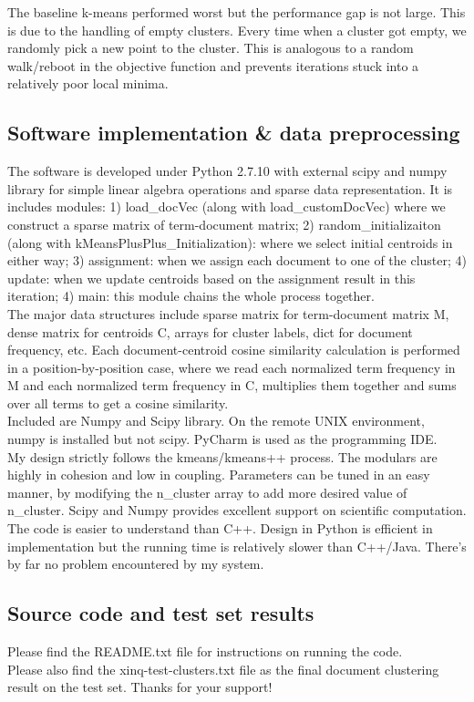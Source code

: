 \documentclass{article}
\begin{document}
The baseline k-means performed worst but the performance gap is not large. This is due to the handling of empty clusters. Every time when a cluster got empty, we randomly pick a new point to the cluster. This is analogous to a random walk/reboot in the objective function and prevents iterations stuck into a relatively poor local minima. 
\subsection{Software implementation \& data preprocessing}
The software is developed under Python 2.7.10 with external scipy and numpy library for simple linear algebra operations and sparse data representation. It is includes modules: 1) load\_docVec (along with load\_customDocVec) where we construct a sparse matrix of term-document matrix; 2) random\_initializaiton (along with kMeansPlusPlus\_Initialization): where we select initial centroids in either way; 3) assignment: when we assign each document to one of the cluster; 4) update: when we update centroids based on the assignment result in this iteration; 4) main: this module chains the whole process together. \\

The major data structures include sparse matrix for term-document matrix M, dense matrix for centroids C, arrays for cluster labels, dict for document frequency, etc. Each document-centroid cosine similarity calculation is performed in a position-by-position case, where we read each normalized term frequency in M and each normalized term frequency in C, multiplies them together and sums over all terms to get a cosine similarity. \\

Included are Numpy and Scipy library. On the remote UNIX environment, numpy is installed but not scipy. PyCharm is used as the programming IDE. \\

My design strictly follows the kmeans/kmeans++ process. The modulars are highly in cohesion and low in coupling. Parameters can be tuned in an easy manner, by modifying the n\_cluster array to add more desired value of n\_cluster. Scipy and Numpy provides excellent support on scientific computation. The code is easier to understand than C++. Design in Python is efficient in implementation but the running time is relatively slower than C++/Java. There's by far no problem encountered by my system. \\

\subsection{Source code and test set results}
Please find the README.txt file for instructions on running the code. \\

Please also find the xinq-test-clusters.txt file as the final document clustering result on the test set. Thanks for your support!
\end{document}
